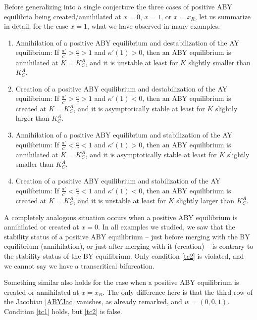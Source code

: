\documentclass[12pt]{article}
\theoremstyle{definition}
\begin{document}
Before generalizing into a single conjecture the three cases of positive ABY equilibria being created/annihilated at $x=0$, $x=1$, or $x=x_R$, let us summarize in detail, for the case $x=1$, what we have observed in many examples:
\begin{enumerate}
	\item Annihilation of a positive ABY equilibrium and destabilization of the AY equilibrium: If $\frac{a'}{c'}>\frac{a}{c}>1$ and $\kappa'(1)>0$, then an ABY equilibrium is annihilated at $K=K^A_C$, and it is unstable at least for $K$ slightly smaller than $K^A_C$.
	\item Creation of a positive ABY equilibrium and destabilization of the AY equilibrium: If $\frac{a'}{c'}>\frac{a}{c}>1$ and $\kappa'(1)<0$, then an ABY equilibrium is created at $K=K^A_C$, and it is asymptotically stable at least for $K$ slightly larger than $K^A_C$.
	\item Annihilation of a positive ABY equilibrium and stabilization of the AY equilibrium: If $\frac{a'}{c'}<\frac{a}{c}<1$ and $\kappa'(1)>0$, then an ABY equilibrium is annihilated at $K=K^A_C$, and it is asymptotically stable at least for $K$ slightly smaller than $K^A_C$. 
	\item Creation of a positive ABY equilibrium and stabilization of the AY equilibrium: If $\frac{a'}{c'}<\frac{a}{c}<1$ and $\kappa'(1)<0$, then an ABY equilibrium is created at $K=K^A_C$, and it is unstable at least for $K$ slightly larger than $K^A_C$. 
\end{enumerate}       


A completely analogous situation occurs when a positive ABY equilibrium is annihilated or created at $x=0$. In all examples we studied, we saw that the stability status of a positive ABY equilibrium -- just before merging with the BY equilibrium (annihilation), or just after merging with it (creation) -- is contrary to the stability status of the BY equilibrium. Only condition \eqref{tc2} is violated, and we cannot say we have a transcritical bifurcation. 

Something similar also holds for the case when a positive ABY equilibrium is created or annihilated at $x=x_R$. The only difference here is that the third row of the Jacobian \eqref{ABYJac} vanishes, as already remarked, and $w=(0,0,1)$. Condition \eqref{tc1} holds, but \eqref{tc2} is false. 
\end{document}
